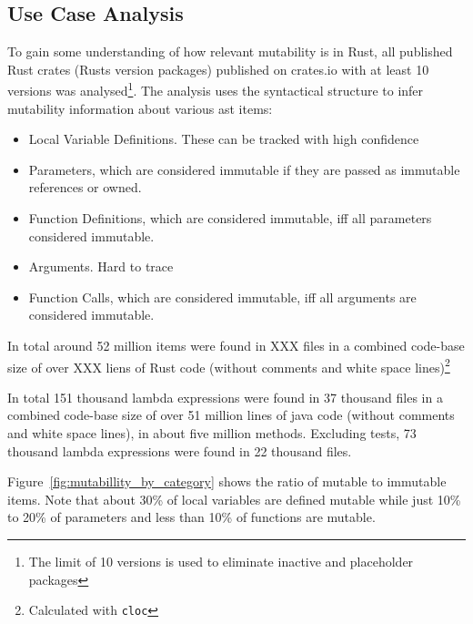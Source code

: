 \documentclass[11pt]{article}
\begin{document}
\newpage
\begin{appendices}

\section{Use Case Analysis}

To gain some understanding of how relevant mutability is in Rust, all published Rust crates (Rusts version packages) published on crates.io with at least 10 versions was analysed\footnote{The limit of 10 versions is used to eliminate inactive and placeholder packages}. The analysis uses the syntactical structure to infer mutability information about various ast items: 
\begin{itemize}
	\item Local Variable Definitions. These can be tracked with high confidence
	\item Parameters, which are considered immutable if they are passed as immutable references or owned.
	\item Function Definitions, which are considered immutable, iff all parameters considered immutable.
	\item Arguments. Hard to trace
	\item Function Calls, which are considered immutable, iff all arguments are considered immutable.
\end{itemize}
In total around 52 million items were found in XXX files in a combined code-base size of over XXX liens of Rust code (without comments and white space lines)\footnote{Calculated with \texttt{cloc}}


In total 151 thousand lambda expressions were found in 37 thousand files in a combined code-base size of over 51 million lines of java code (without comments and white space lines), in about five million methods. Excluding tests, 73 thousand lambda expressions were found in 22 thousand files. 


Figure~\ref{fig:mutabillity_by_category} shows the ratio of mutable to immutable items. Note that about 30\% of local variables are defined mutable while just 10\% to 20\% of parameters and less than 10\% of functions are mutable.


\end{appendices}
\end{document}
